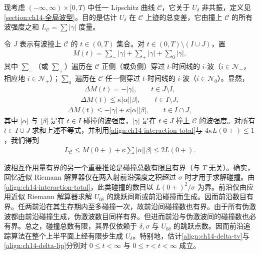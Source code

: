 \documentclass[../../main.tex]{subfiles}
\begin{document}
现考虑 $(-\infty,\infty)\times[0,T)$ 中任一 Lipschitz 曲线 $\mathscr{C}$，它关于 $U_\delta$ 非共振，定义见\cref{section:ch14-全局波型}。目的是估计 $U_\delta$ 在 $\mathscr{C}$ 上迹的总变差，它由撞上 $\mathscr{C}$ 的所有波强度之和 $L_{\mathscr{C}}=\sum|\gamma|$ 度量。

令 $J$ 表示有波撞上 $\mathscr{C}$ 的 $t\in(0,T)$ 集合。对 $t\in(0,T)\setminus(I\cup J)$，置
\begin{align}
M(t)=\sum_-|\gamma|+\sum_+|\gamma|+\sum_0|\gamma|,
\label{align:ch14-M}
\end{align}
其中 $\sum_-$（或 $\sum_+$）遍历在 $\mathscr{C}$ 正侧（或负侧）穿过 $t$-时间线的 $i$-波（$i\in\mathscr{N}_-$，相应地 $i\in\mathscr{N}_+$）；$\sum_0$ 遍历在 $\mathscr{C}$ 任一侧穿过 $t$-时间线的 $i$-波（$i\in\mathscr{N}_0$）。显然，
\begin{align}
\Delta M(t)=-|\gamma|,\qquad t\in J\setminus I,
\label{align:ch14-deltaM1}
\end{align}
\begin{align}
\Delta M(t)\leqslant\kappa|\alpha||\beta|,\qquad t\in I\setminus J,
\label{align:ch14-deltaM2}
\end{align}
\begin{align}
\Delta M(t)\leqslant-|\gamma|+\kappa|\alpha||\beta|,\qquad t\in I\cap J,
\label{align:ch14-deltaM3}
\end{align}
其中 $|\alpha|$ 与 $|\beta|$ 是在 $t\in I$ 碰撞的波强度，$|\gamma|$ 是在 $t\in J$ 撞上 $\mathscr{C}$ 的波强度。对所有 $t\in I\cup J$ 求和上述不等式，并利用\eqref{align:ch14-interaction-total}与 $4\kappa L(0+)\leqslant1$，我们得到
\begin{align}
L_{\mathscr{C}}\leqslant M(0+)+\kappa\sum|\alpha||\beta|\leqslant2L(0+).
\label{align:ch14-LC-bound}
\end{align}

波相互作用量有界的另一个重要推论是碰撞总数有限且有界（与 $T$ 无关）。确实，回忆近似 Riemann 解算器仅在两入射前沿强度之积超过 $\sigma$ 时才用于求解碰撞。由\eqref{align:ch14-interaction-total}，此类碰撞的数目以 $L(0+)^2/\sigma$ 为界。前沿仅由应用近似 Riemann 解算器求解 $U_{0\delta}$ 的跳跃间断或前沿碰撞而生成。因而前沿数目有界。任两前沿在其生存期内至多碰撞一次，故前沿间碰撞数也有界。由于所有伪激波都由前沿碰撞生成，伪激波数目同样有界。但进而前沿与伪激波间的碰撞数也必有界。总之，碰撞总数有限，其界仅依赖于 $\delta,\sigma$ 与 $U_{0\delta}$ 的跳跃点数。因而前沿追踪算法在整个上半平面上经有限步生成 $U_\delta$。特别地，估计\eqref{align:ch14-delta-tv}与\eqref{align:ch14-delta-lip}分别对 $0\leqslant t<\infty$ 与 $0\leqslant\tau<t<\infty$ 成立。
\end{document}
